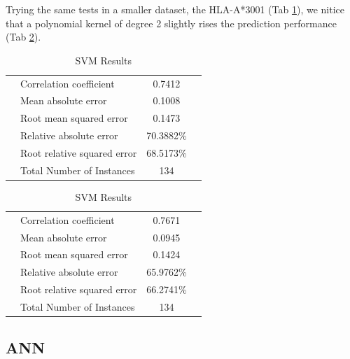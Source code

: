 Trying the same tests in a smaller dataset, the HLA-A*3001 (Tab \ref{tab:svm6}), we nitice that a polynomial kernel of degree 2 slightly rises the prediction performance (Tab \ref{tab:svm7}).

\begin{table}[ht]
\begin{center}
\begin{tabular}{ ll c r }
\hline
 & Correlation coefficient       &           0.7412 \\
 & Mean absolute error            &          0.1008 \\
 & Root mean squared error        &          0.1473 \\
 & Relative absolute error        &         70.3882\% \\
 & Root relative squared error    &         68.5173\% \\
 & Total Number of Instances      &        134 \\
\hline
\end{tabular}
\label{tab:svm6}
\caption{SVM Results}
\end{center}
\end{table}


\begin{table}[ht]
\begin{center}
\begin{tabular}{ ll c r }
\hline
 & Correlation coefficient        &          0.7671 \\
 & Mean absolute error            &          0.0945 \\
 & Root mean squared error        &          0.1424 \\
 & Relative absolute error        &         65.9762\% \\
 & Root relative squared error    &         66.2741\% \\
 & Total Number of Instances      &        134 \\
\hline
\end{tabular}
\label{tab:svm7}
\caption{SVM Results}
\end{center}
\end{table}

\subsection*{ANN}

